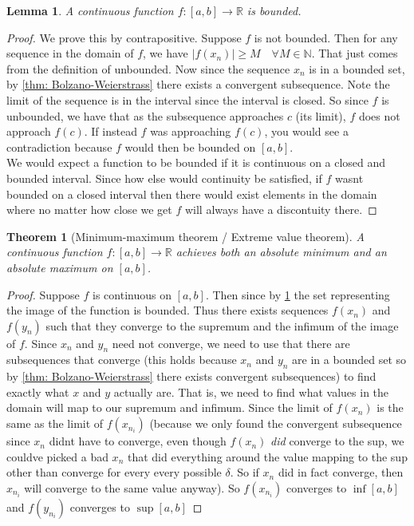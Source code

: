 \documentclass{article}
\newtheorem{theorem}{Theorem}[section]
\newtheorem{lemma}{Lemma}[section]
\theoremstyle{definition}
\theoremstyle{remark}
\begin{document}
\begin{lemma}\label{lem:cnts function is bounded}
A continuous function $f : [a,b] \to \mathbb{R}$ is bounded.
\end{lemma}


\begin{proof}
We prove this by contrapositive. 
Suppose $f$ is not bounded. 
Then for any sequence in the domain of $f$, we have 
$|f(x_n)|\geq M \quad \forall M \in \mathbb{N}$.
That just comes from the definition of unbounded. 
Now since the sequence $x_n$ is in a bounded set, 
by \ref{thm: Bolzano-Weierstrass}
there exists a convergent subsequence.
Note the limit of the sequence is in the interval 
since the interval is closed.
So since $f$ is unbounded, 
we have that as the subsequence approaches $c$ (its limit),
$f$ does not approach $f(c)$. 
If instead $f$ was approaching $f(c)$, you would see a contradiction 
because $f$ would then be bounded on $[a,b]$.\\
\indent We would expect a function to be bounded if it is continuous on a closed and bounded interval. Since
how else would continuity be satisfied, if $f$ wasnt bounded on a closed interval then 
there would exist elements in the domain where 
no matter how close we get $f$ will always have a discontuity there.
\end{proof}


\vspace{.5cm}

\begin{theorem}[Minimum-maximum theorem / Extreme value theorem]\label{thm:evt}
A continuous function $f : [a,b] \to \mathbb{R}$ achieves both an absolute minimum and an absolute maximum on $[a,b]$.
\end{theorem}

\begin{proof}
Suppose $f$ is continuous on $[a,b]$. 
Then since by \ref{lem:cnts function is bounded} the set representing the image of the function is bounded. 
Thus there exists sequences $f(x_n)$ and $f(y_n)$ such that they converge to the supremum and the infimum of the image of $f$.
Since $x_n$ and $y_n$ need not converge, we need to use that there are subsequences that converge (this holds because $x_n$ and $y_n$ are in a bounded set so by \ref{thm: Bolzano-Weierstrass} there exists convergent subsequences) to find exactly what $x$ and $y$ actually are. That is, 
we need to find what values in the domain will map to our supremum and infimum. Since the limit of $f(x_n)$ is the same as the limit of $f(x_{n_i})$ (because we only found 
the convergent subsequence since $x_n$ didnt have to converge, even though $f(x_n)$ \emph{did} converge to the sup, 
we couldve picked a bad $x_n$ that did everything around the value 
mapping to the sup other than converge for every every possible $\delta$. So if $x_n$ did in fact converge, then $x_{n_i}$ will converge to the same value anyway). 
So $f(x_{n_i})$ converges to $\inf[a,b]$ and 
$f(y_{n_i})$ converges to $\sup[a,b]$
\end{proof}
\end{document}
